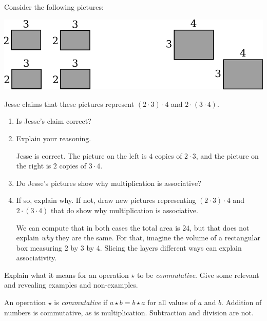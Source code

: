 \documentclass[nooutcomes]{ximera}
\begin{document}
\begin{problem}Consider the following pictures:
\begin{image}
\includegraphics{assMult.png}
\end{image}
Jesse claims that these pictures represent $(2\cdot 3)\cdot 4$ and
$2\cdot (3\cdot 4)$.
\begin{enumerate}
\item Is Jesse's claim correct? 
\begin{multipleChoice}
\end{multipleChoice}
\item Explain your reasoning.
\begin{freeResponse}
\begin{hint}
Jesse is correct.  The picture on the left is $4$ copies of $2\cdot 3$, and the picture on the right is $2$ copies of $3\cdot 4$.  
\end{hint}
\end{freeResponse}
\item Do Jesse's pictures show why multiplication is associative? 
\begin{multipleChoice}
\end{multipleChoice}
\item If so, explain why. If not, draw new pictures representing $(2\cdot
  3)\cdot 4$ and $2\cdot (3\cdot 4)$ that do show why multiplication is associative.
\begin{freeResponse}
\begin{hint}
We can compute that in both cases the total area is $24$, but that does not explain \textit{why} they are the same.  For that, imagine the volume of a rectangular box measuring $2$ by $3$ by $4$.  Slicing the layers different ways can explain associativity.  
\end{hint}
\end{freeResponse}
\end{enumerate}
\end{problem} 

\begin{problem}Explain what it means for an operation $\star$ to be
  \textit{commutative}. Give some relevant and revealing examples  and non-examples.
\begin{freeResponse}
\begin{hint}
An operation $\star$ is \textit{commutative} if $a\star b = b\star a$ for all values of $a$ and $b$.  Addition of numbers is commutative, as is multiplication.  Subtraction and division are not.  
\end{hint}
\end{freeResponse}
\end{problem} 
\end{document}
